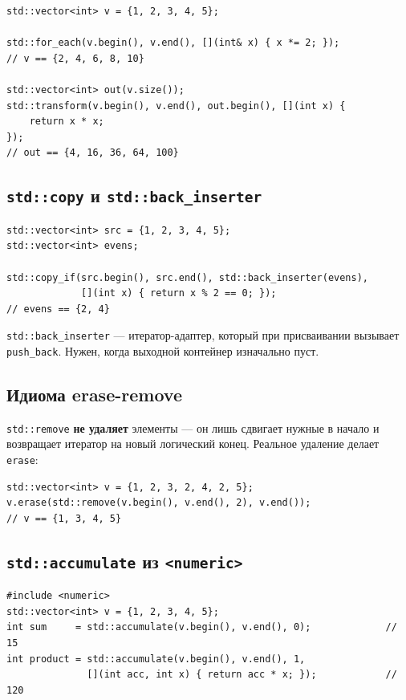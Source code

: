 \documentclass[a4paper,12pt]{article}
\begin{document}
\begin{lstlisting}
std::vector<int> v = {1, 2, 3, 4, 5};

std::for_each(v.begin(), v.end(), [](int& x) { x *= 2; });
// v == {2, 4, 6, 8, 10}

std::vector<int> out(v.size());
std::transform(v.begin(), v.end(), out.begin(), [](int x) {
    return x * x;
});
// out == {4, 16, 36, 64, 100}
\end{lstlisting}

\subsection{\texttt{std::copy} и \texttt{std::back\_inserter}}

\begin{lstlisting}
std::vector<int> src = {1, 2, 3, 4, 5};
std::vector<int> evens;

std::copy_if(src.begin(), src.end(), std::back_inserter(evens),
             [](int x) { return x % 2 == 0; });
// evens == {2, 4}
\end{lstlisting}

\texttt{std::back\_inserter} --- итератор-адаптер, который при присваивании
вызывает \texttt{push\_back}. Нужен, когда выходной контейнер изначально пуст.

\subsection{Идиома erase-remove}

\texttt{std::remove} \textbf{не удаляет} элементы --- он лишь сдвигает
нужные в начало и возвращает итератор на новый логический конец.
Реальное удаление делает \texttt{erase}:

\begin{lstlisting}
std::vector<int> v = {1, 2, 3, 2, 4, 2, 5};
v.erase(std::remove(v.begin(), v.end(), 2), v.end());
// v == {1, 3, 4, 5}
\end{lstlisting}

\subsection{\texttt{std::accumulate} из \texttt{<numeric>}}

\begin{lstlisting}
#include <numeric>
std::vector<int> v = {1, 2, 3, 4, 5};
int sum     = std::accumulate(v.begin(), v.end(), 0);             // 15
int product = std::accumulate(v.begin(), v.end(), 1,
              [](int acc, int x) { return acc * x; });            // 120
\end{lstlisting}
\end{document}
